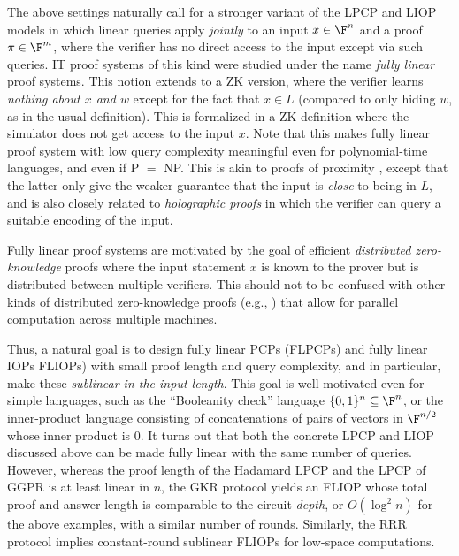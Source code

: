 The above settings naturally call for a stronger variant of the LPCP and LIOP models in which linear queries apply {\em jointly} to an input $x\in \F^n$ and a proof $\pi\in\F^m$, where the verifier has no direct access to the input except via such queries. 
IT proof systems of this kind were studied \cite{2019:BBCGI:crypto:ZKPs-on-secret-shared-data-via-FLPCP} under the name {\em fully linear} proof systems.
This notion extends to a ZK version, where the verifier learns {\em nothing about $x$ and $w$} except for the fact that $x\in L$ (compared to only hiding $w$, as in the usual definition). 
This is formalized in a ZK definition where the simulator does not get access to the input $x$.%
Note that this makes fully linear proof system with low query complexity meaningful even for polynomial-time languages, and even if P $=$ NP.
This is akin to proofs of proximity \cite{2004:BGHSV:STOC:robust-PCPs-proximity}, except that the latter only give the weaker guarantee that the input is {\em close} to being in $L$, and is also closely related to {\em holographic proofs} \cite{1991:BFL:checking-computations} in which the verifier can query a suitable encoding of the input.   
\loosen

Fully linear proof systems are motivated by the goal of efficient {\em distributed zero-knowledge} proofs where the input statement $x$ is known to the prover but is distributed between multiple verifiers. 
This should not to be confused with other kinds of distributed zero-knowledge proofs (e.g., {\cite{2018:WZCPS:DIZK}}) that allow for parallel computation across multiple machines.


Thus, a natural goal is to design fully linear PCPs (FLPCPs) and fully linear IOPs FLIOPs) with small proof length and query complexity, and in particular, make these {\em sublinear in the input length}.
This goal is well-motivated even for simple languages, such as the ``Booleanity check'' language $\{0,1\}^n \subseteq \F^n$, or the inner-product language consisting of concatenations of pairs of vectors in $\F^{n/2}$ whose inner product is 0.
It turns out that both the concrete LPCP and LIOP discussed above can be made fully linear with the same number of queries. 
However, whereas the proof length of the Hadamard LPCP and the LPCP of GGPR is at least linear in $n$, the GKR protocol \cite{2008:GKR} yields an FLIOP whose total proof and answer length is comparable to the circuit {\em depth}, or $O(\log^2n)$ for the above examples, with a similar number of rounds. 
Similarly, the RRR protocol \cite{2016:RRR:stoc:Constant-round-IP-for-Delegating-Computation} implies constant-round sublinear FLIOPs for low-space computations. 

